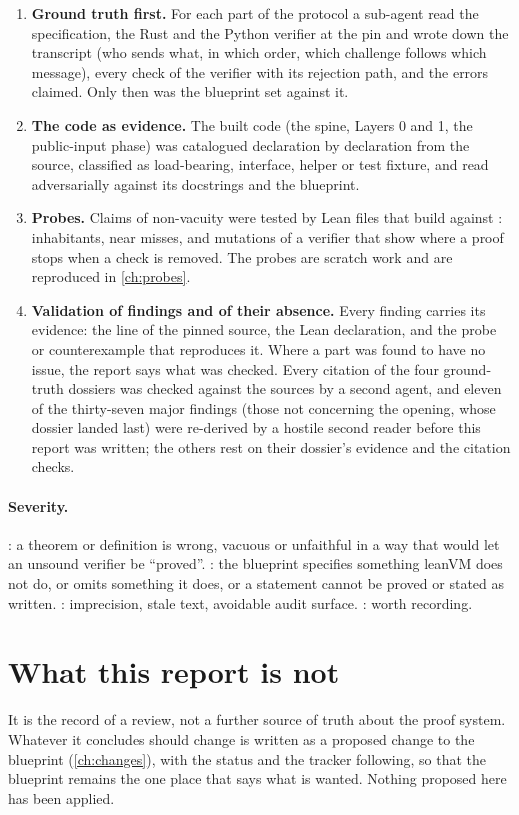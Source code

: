 \begin{enumerate}
\item \textbf{Ground truth first.} For each part of the protocol a sub-agent read the
  specification, the Rust and the Python verifier at the pin and wrote down the transcript
  (who sends what, in which order, which challenge follows which message), every check of the
  verifier with its rejection path, and the errors claimed. Only then was the blueprint set
  against it.
\item \textbf{The code as evidence.} The built code (the spine, Layers 0 and 1, the public-input
  phase) was catalogued declaration by declaration from the source, classified as load-bearing,
  interface, helper or test fixture, and read adversarially against its docstrings and the
  blueprint.
\item \textbf{Probes.} Claims of non-vacuity were tested by Lean files that build against
  : inhabitants, near misses, and mutations of a verifier that show where a proof
  stops when a check is removed. The probes are scratch work and are reproduced in
  \cref{ch:probes}.
\item \textbf{Validation of findings and of their absence.} Every finding carries its evidence:
  the line of the pinned source, the Lean declaration, and the probe or counterexample that
  reproduces it. Where a part was found to have no issue, the report says what was checked.
  Every citation of the four ground-truth dossiers was checked against the sources by a
  second agent, and eleven of the thirty-seven major findings (those not concerning the
  opening, whose dossier landed last) were re-derived by a hostile second reader before this
  report was written; the others rest on their dossier's evidence and the citation checks.
\end{enumerate}

\paragraph{Severity.} : a theorem or definition is wrong, vacuous or unfaithful in
a way that would let an unsound verifier be \enquote{proved}. : the blueprint
specifies something leanVM does not do, or omits something it does, or a statement cannot be
proved or stated as written. : imprecision, stale text, avoidable audit surface.
: worth recording.

\section{What this report is not}

It is the record of a review, not a further source of truth about the proof system. Whatever it
concludes should change is written as a proposed change to the blueprint (\cref{ch:changes}),
with the status and the tracker following, so that the blueprint remains the one place that
says what is wanted. Nothing proposed here has been applied.
